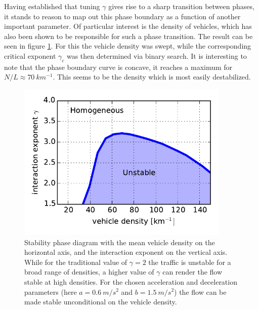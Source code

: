 Having established that tuning $\gamma$ gives rise to a sharp transition between phases, it stands to reason to map out this phase boundary as a function of another important parameter. Of particular interest is the density of vehicles, which has also been shown to be responsible for such a phase transition. The result can be seen in figure \ref{fig:phase_diagram}. For this the vehicle density was swept, while the corresponding critical exponent $\gamma_c$ was then determined via binary search. It is interesting to note that the phase boundary curve is concave, it reaches a maximum for $N/L \approx \SI{70}{km^{-1}}$. This seems to be the density which is most easily destabilized.
\begin{figure}
    \centering
    \includegraphics[width=4in]{../img/phase_diagram.pdf}
    \caption{Stability phase diagram with the mean vehicle density on the horizontal axis, and the interaction exponent on the vertical axis. While for the traditional value of $\gamma=2$ the traffic is unstable for a broad range of densities, a higher value of $\gamma$ can render the flow stable at high densities. For the chosen acceleration and deceleration parameters (here $a=\SI{0.6}{m/s^2}$ and $b=\SI{1.5}{m/s^2}$) the flow can be made stable unconditional on the vehicle density.}
    \label{fig:phase_diagram}
\end{figure}


